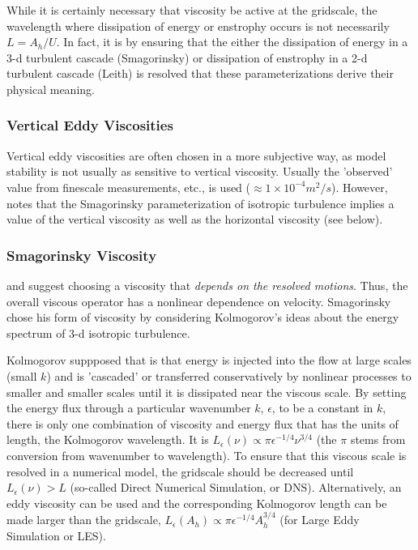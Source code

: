 While it is certainly necessary that viscosity be active at the
gridscale, the wavelength where dissipation of energy or enstrophy
occurs is not necessarily $L=A_h/U$.  In fact, it is by ensuring that
the either the dissipation of energy in a 3-d turbulent cascade
(Smagorinsky) or dissipation of enstrophy in a 2-d turbulent cascade
(Leith) is resolved that these parameterizations derive their physical
meaning.
  
\subsubsection{Vertical Eddy Viscosities}
Vertical eddy viscosities are often chosen in a more subjective way,
as model stability is not usually as sensitive to vertical viscosity.
Usually the 'observed' value from finescale measurements, etc., is
used ($\approx1\times10^{-4} m^2/s$).  However,
\citet{Smagorinsky93} notes that the Smagorinsky parameterization of
isotropic turbulence implies a value of the vertical viscosity as well
as the horizontal viscosity (see below).
 
\subsubsection{Smagorinsky Viscosity}
\citet{sm63} and \citet{Smagorinsky93} suggest choosing a viscosity
that \emph{depends on the resolved motions}.  Thus, the overall
viscous operator has a nonlinear dependence on velocity.  Smagorinsky
chose his form of viscosity by considering Kolmogorov's ideas about
the energy spectrum of 3-d isotropic turbulence.

Kolmogorov suppposed that is that energy is injected into the flow at
large scales (small $k$) and is 'cascaded' or transferred
conservatively by nonlinear processes to smaller and smaller scales
until it is dissipated near the viscous scale.  By setting the energy
flux through a particular wavenumber $k$, $\epsilon$, to be a constant
in $k$, there is only one combination of viscosity and energy flux
that has the units of length, the Kolmogorov wavelength.  It is
$L_\epsilon(\nu)\propto\pi\epsilon^{-1/4}\nu^{3/4}$ (the $\pi$ stems
from conversion from wavenumber to wavelength).  To ensure that this
viscous scale is resolved in a numerical model, the gridscale should
be decreased until $L_\epsilon(\nu)>L$ (so-called Direct Numerical
Simulation, or DNS).  Alternatively, an eddy viscosity can be used and
the corresponding Kolmogorov length can be made larger than the
gridscale, $L_\epsilon(A_h)\propto\pi\epsilon^{-1/4}A_h^{3/4}$ (for
Large Eddy Simulation or LES).


